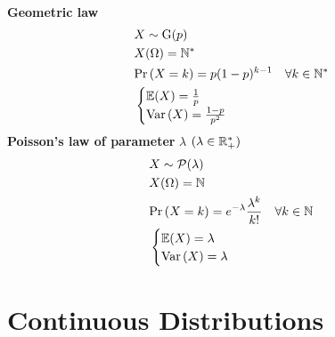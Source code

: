 \documentclass{report}
\begin{document}
\begin{enumerate}
\begin{align*}
	\end{align*}
	\ii \textbf{Geometric law}
	\begin{align*}
		 & X \sim \mathrm{G}(p)                          \\
		 & X(\Omega) = \NN^*                             \\
		 & \Pr{X=k} =p(1-p)^{k-1}\quad\forall k\in \NN^* \\
		 & \begin{cases}
			   \EE(X) = \frac{1}{p} \\
			   \Var{X} = \frac{1-p}{p^2}
		   \end{cases}
	\end{align*}
	\ii \textbf{Poisson's law of parameter} $\lambda$ $(\lambda\in\RR_+^*)$
	\begin{align*}
		 & X \sim \mathcal{P}(\lambda)                                      \\
		 & X(\Omega) = \NN                                                  \\
		 & \Pr{X=k} = e^{-\lambda}\frac{\lambda^k}{k!}\quad\forall k\in \NN \\
		 & \begin{cases}
			   \EE(X) = \lambda \\
			   \Var{X} = \lambda
		   \end{cases}
	\end{align*}

\end{enumerate}

\section{Continuous Distributions}
\end{document}

